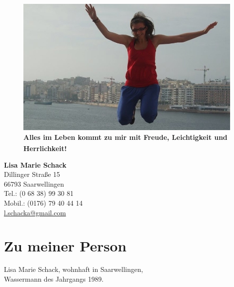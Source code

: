 \documentclass[10pt,foldmark,notumble]{leaflet}
\begin{document}
\newpage
\vfill
\begin{figure}[t]%
\begin{center}
\includegraphics [scale=.30, angle=0]{Bild3.jpg}\\
\vfill
\large \bf Alles im Leben kommt zu mir mit Freude, Leichtigkeit und Herrlichkeit!\textsuperscript{\textregistered}
\end{center}
\end{figure}

\vfill
\vspace*{7mm}
\begin{center}
{\Huge \bf Lisa Marie Schack}\\
\vspace*{7mm}
Dillinger Straße 15\\
66793 Saarwellingen\\
Tel.: (0 68 38) 99 30 81\\
Mobil.: (0176) 79 40 44 14\\
\href{mailto:l.schacka@gmail.com}{l.schacka@gmail.com} \\
\end{center}

\vfill
\section{Zu meiner Person}
Lisa Marie Schack, wohnhaft in Saarwellingen, \\
Wassermann des Jahrgangs 1989.
\end{document}

